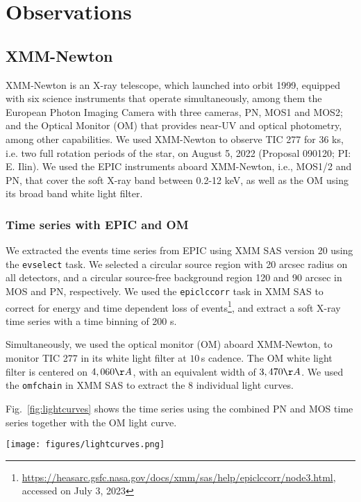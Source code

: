 \documentclass[twocolumn]{aastex631}
\begin{document}
\section{Observations}

\subsection{XMM-Newton}
\label{sec:obs:xmm}
XMM-Newton is an X-ray telescope, which launched into orbit 1999, equipped with six science instruments that operate simultaneously, among them the European Photon Imaging Camera with three cameras, PN, MOS1 and MOS2; and the Optical Monitor (OM) that provides near-UV and optical photometry, among other capabilities.
We used XMM-Newton to observe TIC 277 for 36 ks, i.e. two full rotation periods of the star, on August 5, 2022 (Proposal 090120; PI: E. Ilin). We used the EPIC instruments aboard XMM-Newton, i.e., MOS1/2 and PN, that cover the soft X-ray band between 0.2-12 keV, as well as the OM using its broad band white light filter.

\subsubsection{Time series with EPIC and OM}

 We extracted the events time series from EPIC using XMM SAS version 20 using the \texttt{evselect} task. We selected a circular source region with 20 arcsec radius on all detectors, and a circular source-free background region 120 and 90 arcsec in MOS and PN, respectively. We used the \texttt{epiclccorr} task in XMM SAS to correct for energy and time dependent loss of events\footnote{\url{https://heasarc.gsfc.nasa.gov/docs/xmm/sas/help/epiclccorr/node3.html}, accessed on July 3, 2023}, and extract a soft X-ray time series with a time binning of 200 s.

Simultaneously, we used the optical monitor (OM) aboard XMM-Newton, to monitor TIC 277 in its white light filter at $10$\,s cadence. The OM white light filter is centered on $4,060\AA$, with an equivalent width of $3,470\AA$. We used the \texttt{omfchain} in XMM SAS to extract the 8 individual light curves.

Fig.~\ref{fig:lightcurves} shows the time series using the combined PN and MOS time series together with the OM light curve.

\begin{figure*}[ht!]
    \begin{centering}
        \texttt{[image: figures/lightcurves.png]}
        \caption{
         Top panel: Optical Monitoring (OM) light curve. Bottom panel: X-ray (PN, MOS1 and MOS2 combined) light curve. The grey shaded portion defines the flare-only subset of the observations (see Section~\ref{sec:methods:epic} and Table~\ref{tab:specfit}).
        }
        \label{fig:lightcurves}
    \end{centering}
\end{figure*}
\end{document}

